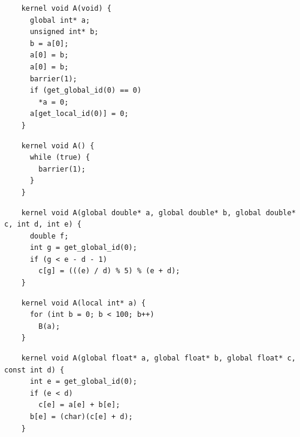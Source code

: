 \newsavebox{\XeonPhiSegfault}
\begin{lrbox}{\XeonPhiSegfault}
  \hspace{1.5em}
  \begin{lstlisting}
    kernel void A(void) {
      global int* a;
      unsigned int* b;
      b = a[0];
      a[0] = b;
      a[0] = b;
      barrier(1);
      if (get_global_id(0) == 0)
        *a = 0;
      a[get_local_id(0)] = 0;
    }
  \end{lstlisting}
\end{lrbox}

\newsavebox{\IntelVectorizerSegfault}
\begin{lrbox}{\IntelVectorizerSegfault}
  \hspace{1.5em}
  \begin{lstlisting}
    kernel void A() {
      while (true) {
        barrier(1);
      }
    }
  \end{lstlisting}
\end{lrbox}

\newsavebox{\IntelSizetIntUnreduced}
\begin{lrbox}{\IntelSizetIntUnreduced}
  \hspace{1.5em}
  \begin{lstlisting}
    kernel void A(global double* a, global double* b, global double* c, int d, int e) {
      double f;
      int g = get_global_id(0);
      if (g < e - d - 1)
        c[g] = (((e) / d) % 5) % (e + d);
    }
  \end{lstlisting}
\end{lrbox}

\newsavebox{\PoclUndefinedSymbols}
\begin{lrbox}{\PoclUndefinedSymbols}
  \hspace{1.5em}
  \begin{lstlisting}
    kernel void A(local int* a) {
      for (int b = 0; b < 100; b++)
        B(a);
    }
  \end{lstlisting}
\end{lrbox}


\newsavebox{\BeignetCastError}
\begin{lrbox}{\BeignetCastError}
  \hspace{1.5em}
  \begin{lstlisting}
    kernel void A(global float* a, global float* b, global float* c, const int d) {
      int e = get_global_id(0);
      if (e < d)
        c[e] = a[e] + b[e];
      b[e] = (char)(c[e] + d);
    }
  \end{lstlisting}
\end{lrbox}

